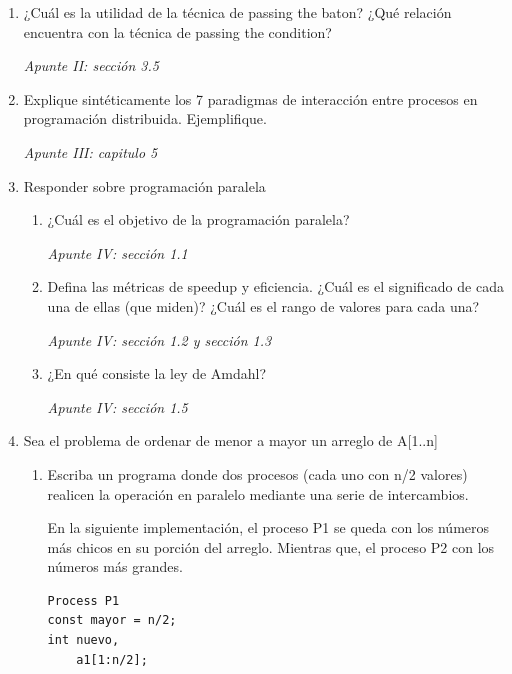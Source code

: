 \documentclass[a4paper, 10pt]{article}
\newenvironment{QandA}{
    \begin{enumerate}\bfseries}
    {\end{enumerate}
}
\newenvironment{answered}{\par\normalfont}{}
\begin{document}
\begin{QandA}

\item ¿Cuál es la utilidad de la técnica de passing the baton? ¿Qué relación encuentra con la técnica de passing the condition?
\begin{answered}
    \emph{Apunte II: sección 3.5}
\end{answered}


\item Explique sintéticamente los 7 paradigmas de interacción entre procesos en programación distribuida. Ejemplifique.
\begin{answered}
    \emph{Apunte III: capitulo 5}
\end{answered}


\item Responder sobre programación paralela
\begin{enumerate}
    \item ¿Cuál es el objetivo de la programación paralela?
    \begin{answered}
        \emph{Apunte IV: sección 1.1}
    \end{answered}
    \item Defina las métricas de speedup y eficiencia. ¿Cuál es el significado de cada una de ellas (que miden)? ¿Cuál es el rango de valores para cada una?
    \begin{answered}
        \emph{Apunte IV: sección 1.2 y sección 1.3}
    \end{answered}
    \item ¿En qué consiste la ley de Amdahl?
    \begin{answered}
        \emph{Apunte IV: sección 1.5}
    \end{answered}
\end{enumerate}


\item Sea el problema de ordenar de menor a mayor un arreglo de A[1..n] 

\begin{enumerate}[labelindent=0pt, align=left, leftmargin=0pt]
\item Escriba un programa donde dos procesos (cada uno con n/2 valores) realicen la operación en paralelo mediante una serie de intercambios. 
\begin{answered}
En la siguiente implementación, el proceso P1 se queda con los números más chicos en su porción del arreglo. Mientras que, el proceso P2 con los números más grandes.
\begin{lstlisting}[multicols=2]
Process P1
const mayor = n/2;
int nuevo,
    a1[1:n/2];


\end{lstlisting}
\end{answered}
\end{enumerate}
\end{QandA}
\end{document}
